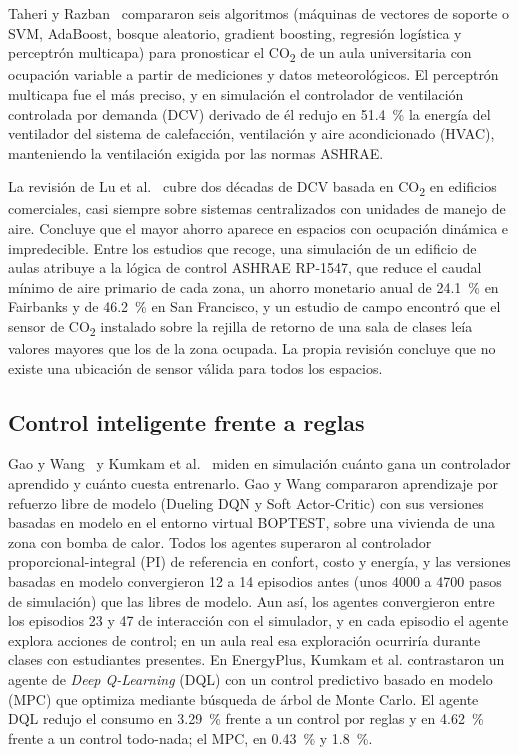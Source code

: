 \documentclass[manuscript,screen,nonacm,natbib=false]{acmart}
\newcommand{\COdos}{CO\textsubscript{2}}
\begin{document}
Taheri y Razban~\cite{taheri2021learning} compararon seis algoritmos (máquinas de vectores de soporte o SVM, AdaBoost, bosque aleatorio, gradient boosting, regresión logística y perceptrón multicapa) para pronosticar el \COdos{} de un aula universitaria con ocupación variable a partir de mediciones y datos meteorológicos. El perceptrón multicapa fue el más preciso, y en simulación el controlador de ventilación controlada por demanda (DCV) derivado de él redujo en 51.4~\% la energía del ventilador del sistema de calefacción, ventilación y aire acondicionado (HVAC), manteniendo la ventilación exigida por las normas ASHRAE.

La revisión de Lu et al.~\cite{lu2022dcv} cubre dos décadas de DCV basada en \COdos{} en edificios comerciales, casi siempre sobre sistemas centralizados con unidades de manejo de aire. Concluye que el mayor ahorro aparece en espacios con ocupación dinámica e impredecible. Entre los estudios que recoge, una simulación de un edificio de aulas atribuye a la lógica de control ASHRAE RP-1547, que reduce el caudal mínimo de aire primario de cada zona, un ahorro monetario anual de 24.1~\% en Fairbanks y de 46.2~\% en San Francisco, y un estudio de campo encontró que el sensor de \COdos{} instalado sobre la rejilla de retorno de una sala de clases leía valores mayores que los de la zona ocupada. La propia revisión concluye que no existe una ubicación de sensor válida para todos los espacios.

\subsection{Control inteligente frente a reglas}
Gao y Wang~\cite{gao2023comparative} y Kumkam et al.~\cite{kumkam2025comparative} miden en simulación cuánto gana un controlador aprendido y cuánto cuesta entrenarlo. Gao y Wang compararon aprendizaje por refuerzo libre de modelo (Dueling DQN y Soft Actor-Critic) con sus versiones basadas en modelo en el entorno virtual BOPTEST, sobre una vivienda de una zona con bomba de calor. Todos los agentes superaron al controlador proporcional-integral (PI) de referencia en confort, costo y energía, y las versiones basadas en modelo convergieron 12 a 14 episodios antes (unos 4000 a 4700 pasos de simulación) que las libres de modelo. Aun así, los agentes convergieron entre los episodios 23 y 47 de interacción con el simulador, y en cada episodio el agente explora acciones de control; en un aula real esa exploración ocurriría durante clases con estudiantes presentes. En EnergyPlus, Kumkam et al. contrastaron un agente de \textit{Deep Q-Learning} (DQL) con un control predictivo basado en modelo (MPC) que optimiza mediante búsqueda de árbol de Monte Carlo. El agente DQL redujo el consumo en 3.29~\% frente a un control por reglas y en 4.62~\% frente a un control todo-nada; el MPC, en 0.43~\% y 1.8~\%.
\end{document}
